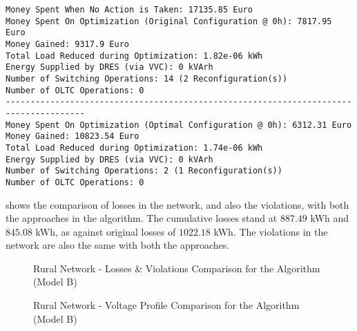 \begin{lstlisting}[title=Console Output With Load Model B]
Money Spent When No Action is Taken: 17135.85 Euro
Money Spent On Optimization (Original Configuration @ 0h): 7817.95 Euro
Money Gained: 9317.9 Euro
Total Load Reduced during Optimization: 1.82e-06 kWh
Energy Supplied by DRES (via VVC): 0 kVArh
Number of Switching Operations: 14 (2 Reconfiguration(s))
Number of OLTC Operations: 0
--------------------------------------------------------------------------------------
Money Spent On Optimization (Optimal Configuration @ 0h): 6312.31 Euro
Money Gained: 10823.54 Euro
Total Load Reduced during Optimization: 1.74e-06 kWh
Energy Supplied by DRES (via VVC): 0 kVArh
Number of Switching Operations: 2 (1 Reconfiguration(s))
Number of OLTC Operations: 0
\end{lstlisting}

 shows the comparison of losses in the network, and also the violations, with both the approaches in the algorithm. The cumulative losses stand at $887.49$ kWh and $845.08$ kWh, as against original losses of $1022.18$ kWh. The violations in the network are also the same with both the approaches.

\begin{figure}[!h]
\begin{minipage}[!h]{.5\textwidth}
	\centering
    \setlength\figureheight{5cm}
    \setlength\figurewidth{6cm}
	
\end{minipage}
\begin{minipage}[!h]{.5\textwidth}
	\centering
	\setlength\figureheight{5cm}
    \setlength\figurewidth{6cm}
	
\end{minipage}
\caption{Rural Network - Losses \& Violations Comparison for the Algorithm (Model B)}
\end{figure}

\begin{figure}[H]
\begin{minipage}[!h]{.5\textwidth}
	\centering
    \setlength\figureheight{5cm}
    \setlength\figurewidth{6cm}
	
\end{minipage}
\begin{minipage}[!h]{.5\textwidth}
	\centering
	\setlength\figureheight{5cm}
    \setlength\figurewidth{6cm}
	
\end{minipage}
\caption{Rural Network - Voltage Profile Comparison for the Algorithm (Model B)}
\end{figure}


